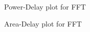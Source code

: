\documentclass[a4paper, twoside]{article}      %
\begin{document}
\begin{figure}[h!]
{\centering {} \par}
\caption{Power-Delay plot for FFT}
\end{figure}

\begin{figure}[h!]
{\centering {} \par}
\caption{Area-Delay plot for FFT}
\end{figure}
\end{document}
